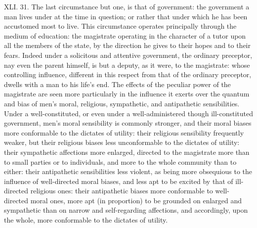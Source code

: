 \documentclass[12pt]{report}
\begin{document}
XLI. 31. The last circumstance but one, is that of government: the
government a man lives under at the time in question; or rather that
under which he has been accustomed most to live. This circumstance
operates principally through the medium of education: the magistrate
operating in the character of a tutor upon all the members of the state,
by the direction he gives to their hopes and to their fears. Indeed
under a solicitous and attentive government, the ordinary preceptor, nay
even the parent himself, is but a deputy, as it were, to the magistrate:
whose controlling influence, different in this respect from that of the
ordinary preceptor, dwells with a man to his life's end. The effects of
the peculiar power of the magistrate are seen more particularly in the
influence it exerts over the quantum and bias of men's moral, religious,
sympathetic, and antipathetic sensibilities. Under a well-constituted,
or even under a well-administered though ill-constituted government,
men's moral sensibility is commonly stronger, and their moral biases
more conformable to the dictates of utility: their religious sensibility
frequently weaker, but their religious biases less unconformable to the
dictates of utility: their sympathetic affections more enlarged,
directed to the magistrate more than to small parties or to individuals,
and more to the whole community than to either: their antipathetic
sensibilities less violent, as being more obsequious to the influence of
well-directed moral biases, and less apt to be excited by that of
ill-directed religious ones: their antipathetic biases more conformable
to well-directed moral ones, more apt (in proportion) to be grounded on
enlarged and sympathetic than on narrow and self-regarding affections,
and accordingly, upon the whole, more conformable to the dictates of
utility.
\end{document}

